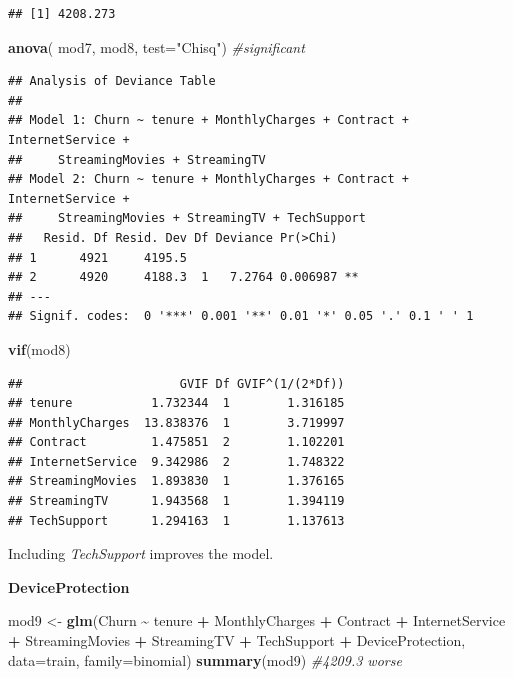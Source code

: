 \documentclass[
  twoside]{article}
\newenvironment{Shaded}{\begin{snugshade}}{\end{snugshade}}
\newcommand{\AttributeTok}[1]{\textcolor[rgb]{0.13,0.29,0.53}{#1}}
\newcommand{\CommentTok}[1]{\textcolor[rgb]{0.56,0.35,0.01}{\textit{#1}}}
\newcommand{\FunctionTok}[1]{\textcolor[rgb]{0.13,0.29,0.53}{\textbf{#1}}}
\newcommand{\NormalTok}[1]{#1}
\newcommand{\OtherTok}[1]{\textcolor[rgb]{0.56,0.35,0.01}{#1}}
\newcommand{\SpecialCharTok}[1]{\textcolor[rgb]{0.81,0.36,0.00}{\textbf{#1}}}
\newcommand{\StringTok}[1]{\textcolor[rgb]{0.31,0.60,0.02}{#1}}
\begin{document}
\begin{verbatim}
## [1] 4208.273
\end{verbatim}

\begin{Shaded}
\begin{Highlighting}[]
\FunctionTok{anova}\NormalTok{( mod7, mod8,  }\AttributeTok{test=}\StringTok{"Chisq"}\NormalTok{) }\CommentTok{\#significant}
\end{Highlighting}
\end{Shaded}

\begin{verbatim}
## Analysis of Deviance Table
## 
## Model 1: Churn ~ tenure + MonthlyCharges + Contract + InternetService + 
##     StreamingMovies + StreamingTV
## Model 2: Churn ~ tenure + MonthlyCharges + Contract + InternetService + 
##     StreamingMovies + StreamingTV + TechSupport
##   Resid. Df Resid. Dev Df Deviance Pr(>Chi)   
## 1      4921     4195.5                        
## 2      4920     4188.3  1   7.2764 0.006987 **
## ---
## Signif. codes:  0 '***' 0.001 '**' 0.01 '*' 0.05 '.' 0.1 ' ' 1
\end{verbatim}

\begin{Shaded}
\begin{Highlighting}[]
\FunctionTok{vif}\NormalTok{(mod8)}
\end{Highlighting}
\end{Shaded}

\begin{verbatim}
##                      GVIF Df GVIF^(1/(2*Df))
## tenure           1.732344  1        1.316185
## MonthlyCharges  13.838376  1        3.719997
## Contract         1.475851  2        1.102201
## InternetService  9.342986  2        1.748322
## StreamingMovies  1.893830  1        1.376165
## StreamingTV      1.943568  1        1.394119
## TechSupport      1.294163  1        1.137613
\end{verbatim}

Including \emph{TechSupport} improves the model.

\textbf{DeviceProtection}

\begin{Shaded}
\begin{Highlighting}[]
\NormalTok{mod9 }\OtherTok{\textless{}{-}} \FunctionTok{glm}\NormalTok{(Churn }\SpecialCharTok{\textasciitilde{}}\NormalTok{ tenure }\SpecialCharTok{+}\NormalTok{ MonthlyCharges }\SpecialCharTok{+}\NormalTok{ Contract }\SpecialCharTok{+}\NormalTok{ InternetService }\SpecialCharTok{+} 
\NormalTok{            StreamingMovies }\SpecialCharTok{+}\NormalTok{ StreamingTV }\SpecialCharTok{+}\NormalTok{ TechSupport }\SpecialCharTok{+}\NormalTok{ DeviceProtection, }
            \AttributeTok{data=}\NormalTok{train, }\AttributeTok{family=}\NormalTok{binomial)}
\FunctionTok{summary}\NormalTok{(mod9) }\CommentTok{\#4209.3 worse}
\end{Highlighting}
\end{Shaded}
\end{document}
